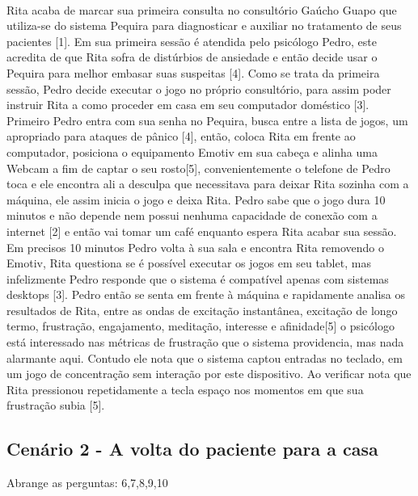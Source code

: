 \documentclass[12pt]{article}
\begin{document}
\paragraph{} Rita acaba de marcar sua primeira consulta no consultório Gaúcho Guapo que utiliza-se do sistema Pequira para diagnosticar e auxiliar no tratamento de seus pacientes [1]. Em sua primeira sessão é atendida pelo psicólogo Pedro, este acredita de que Rita sofra de distúrbios de ansiedade e então decide usar o Pequira para melhor embasar suas suspeitas [4]. Como se trata da primeira sessão, Pedro decide executar o jogo no próprio consultório, para assim poder instruir Rita a como proceder em casa em seu computador doméstico [3]. Primeiro Pedro entra com sua senha no Pequira, busca entre a lista de jogos, um apropriado para ataques de pânico [4], então, coloca Rita em frente ao computador, posiciona o equipamento Emotiv em sua cabeça e alinha uma Webcam a fim de captar o seu rosto[5], convenientemente o telefone de Pedro toca e ele encontra ali a desculpa que necessitava para deixar Rita sozinha com a máquina, ele assim inicia o jogo e deixa Rita. Pedro sabe que o jogo dura 10 minutos e não depende nem possui nenhuma capacidade de conexão com a internet [2] e então vai tomar um café enquanto espera Rita acabar sua sessão. Em precisos 10 minutos Pedro volta à sua sala e encontra Rita removendo o Emotiv, Rita questiona se é possível executar os jogos em seu tablet, mas infelizmente Pedro responde que o sistema é compatível apenas com sistemas desktops [3]. Pedro então se senta em frente à máquina e rapidamente analisa os resultados de Rita, entre as ondas de excitação instantânea, excitação de longo termo, frustração, engajamento, meditação, interesse e afinidade[5] o psicólogo está interessado nas métricas de frustração que o sistema providencia, mas nada alarmante aqui. Contudo ele nota que o sistema captou entradas no teclado, em um jogo de concentração sem interação por este dispositivo. Ao verificar nota que Rita pressionou repetidamente a tecla espaço nos momentos em que sua frustração subia [5]. 


\subsection{Cenário 2 - A volta do paciente para a casa}
Abrange as perguntas: 6,7,8,9,10
\end{document}
